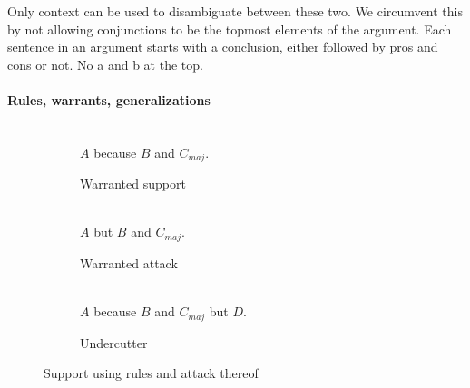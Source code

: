 \documentclass{IOS-Book-Article}
\newcommand{\figsentence}[1]{\\{\sffamily{}#1}}
\begin{document}
Only context can be used to disambiguate between these two. We circumvent this by not allowing conjunctions to be the topmost elements of the argument. Each sentence in an argument starts with a conclusion, either followed by pros and cons or not. No a and b at the top.

\paragraph{Rules, warrants, generalizations}

\begin{figure}[ht!]
	\centering
	\begin{subfigure}[b]{0.3\textwidth}
		\centering
		\figsentence{$A$ because $B$ and $C_{maj}$.}
		\caption{Warranted support}
		\label{fig:warrantedsupport}
	\end{subfigure}
	\begin{subfigure}[b]{0.3\textwidth}
		\centering
		\figsentence{$A$ but $B$ and $C_{maj}$.}
		\caption{Warranted attack}
		\label{fig:warrantedattack}
	\end{subfigure}
	\begin{subfigure}[b]{0.3\textwidth}
		\centering
		\figsentence{$A$ because $B$ and $C_{maj}$ but $D$.}
		\caption{Undercutter}
		\label{fig:undercutter}
	\end{subfigure}
	\caption{Support using rules and attack thereof}
\end{figure}
\end{document}
